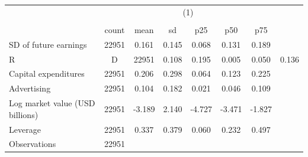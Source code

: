 {
\def\sym#1{\ifmmode^{#1}\else\(^{#1}\)\fi}
\begin{tabular}{l*{1}{cccccc}}
\hline\hline
                    &                                                      \\
                    &                                                         \\
                    &       count&        mean&          sd&         p25&         p50&         p75\\
\hline
SD of future earnings&       22951&       0.161&       0.145&       0.068&       0.131&       0.189\\
R&D                 &       22951&       0.108&       0.195&       0.005&       0.050&       0.136\\
Capital expenditures&       22951&       0.206&       0.298&       0.064&       0.123&       0.225\\
Advertising         &       22951&       0.104&       0.182&       0.021&       0.046&       0.109\\
Log market value (USD billions)&       22951&      -3.189&       2.140&      -4.727&      -3.471&      -1.827\\
Leverage            &       22951&       0.337&       0.379&       0.060&       0.232&       0.497\\
\hline
Observations        &       22951&            &            &            &            &            \\
\hline\hline
\end{tabular}
}
